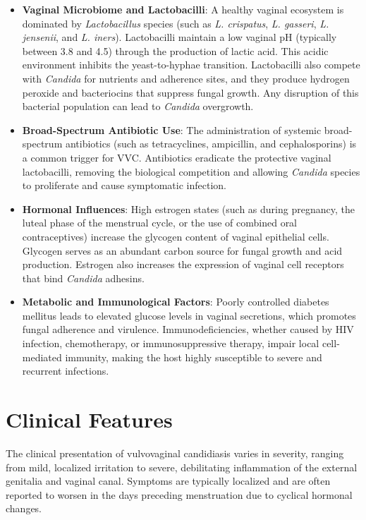 \begin{itemize}
    \item \textbf{Vaginal Microbiome and Lactobacilli}: A healthy vaginal ecosystem is dominated by \textit{Lactobacillus} species (such as \textit{L. crispatus}, \textit{L. gasseri}, \textit{L. jensenii}, and \textit{L. iners}). Lactobacilli maintain a low vaginal pH (typically between 3.8 and 4.5) through the production of lactic acid. This acidic environment inhibits the yeast-to-hyphae transition. Lactobacilli also compete with \textit{Candida} for nutrients and adherence sites, and they produce hydrogen peroxide and bacteriocins that suppress fungal growth. Any disruption of this bacterial population can lead to \textit{Candida} overgrowth.
    \item \textbf{Broad-Spectrum Antibiotic Use}: The administration of systemic broad-spectrum antibiotics (such as tetracyclines, ampicillin, and cephalosporins) is a common trigger for VVC. Antibiotics eradicate the protective vaginal lactobacilli, removing the biological competition and allowing \textit{Candida} species to proliferate and cause symptomatic infection.
    \item \textbf{Hormonal Influences}: High estrogen states (such as during pregnancy, the luteal phase of the menstrual cycle, or the use of combined oral contraceptives) increase the glycogen content of vaginal epithelial cells. Glycogen serves as an abundant carbon source for fungal growth and acid production. Estrogen also increases the expression of vaginal cell receptors that bind \textit{Candida} adhesins.
    \item \textbf{Metabolic and Immunological Factors}: Poorly controlled diabetes mellitus leads to elevated glucose levels in vaginal secretions, which promotes fungal adherence and virulence. Immunodeficiencies, whether caused by HIV infection, chemotherapy, or immunosuppressive therapy, impair local cell-mediated immunity, making the host highly susceptible to severe and recurrent infections.
\end{itemize}

\section*{Clinical Features}
The clinical presentation of vulvovaginal candidiasis varies in severity, ranging from mild, localized irritation to severe, debilitating inflammation of the external genitalia and vaginal canal. Symptoms are typically localized and are often reported to worsen in the days preceding menstruation due to cyclical hormonal changes.

